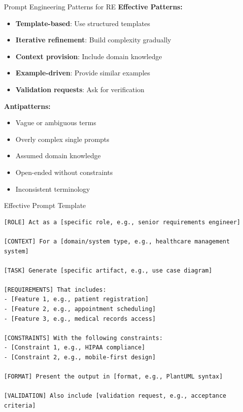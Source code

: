 \documentclass{beamer}
\begin{document}
\begin{frame}[t]{Prompt Engineering Patterns for RE}
            \textbf{Effective Patterns:}
            \begin{itemize}
                \scriptsize
                \item \textbf{Template-based}: Use structured templates
                \item \textbf{Iterative refinement}: Build complexity gradually
                \item \textbf{Context provision}: Include domain knowledge
                \item \textbf{Example-driven}: Provide similar examples
                \item \textbf{Validation requests}: Ask for verification
            \end{itemize}
            \textbf{Antipatterns:}
            \begin{itemize}
                \scriptsize
                \item Vague or ambiguous terms
                \item Overly complex single prompts
                \item Assumed domain knowledge
                \item Open-ended without constraints
                \item Inconsistent terminology
            \end{itemize}
\end{frame}

\begin{frame}[fragile]{Effective Prompt Template}
    \lstset{style=code}
    \begin{lstlisting}[caption={Structured Prompt Template for RE}]
[ROLE] Act as a [specific role, e.g., senior requirements engineer]

[CONTEXT] For a [domain/system type, e.g., healthcare management system]

[TASK] Generate [specific artifact, e.g., use case diagram]

[REQUIREMENTS] That includes:
- [Feature 1, e.g., patient registration]
- [Feature 2, e.g., appointment scheduling]
- [Feature 3, e.g., medical records access]

[CONSTRAINTS] With the following constraints:
- [Constraint 1, e.g., HIPAA compliance]
- [Constraint 2, e.g., mobile-first design]

[FORMAT] Present the output in [format, e.g., PlantUML syntax]

[VALIDATION] Also include [validation request, e.g., acceptance criteria]
    \end{lstlisting}
\end{frame}
\end{document}
